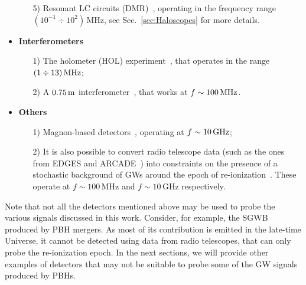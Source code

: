 \documentclass[11pt,a4paper]{article}
\begin{document}
\begin{itemize}[leftmargin=*]
\begin{itemize}[leftmargin=*]
\item[5)] Resonant LC circuits (DMR)~\cite{Domcke:2022rgu}, operating in the frequency range $(10^{-1} \div 10^2) \, \text{MHz}$, see Sec.~\ref{sec:Haloscopes} for more details.
\end{itemize}
%
\item {\bf Interferometers}
%
\begin{itemize}[leftmargin=*]
\item[1)] The holometer (HOL) experiment~\cite{Holometer:2016qoh}, that operates in the range $(1 \div 13) \, {\rm MHz}$;
\item[2)] A $0.75 \, \rm m$ interferometer~\cite{Akutsu:2008qv}, that works at $f \sim 100 \, {\rm MHz}$.
\end{itemize}
%
\item {\bf Others}
%
\begin{itemize}[leftmargin=*]
\item[1)] Magnon-based detectors~\cite{Ito:2019wcb}, operating at $f \sim 10 \, {\rm GHz}$;
\item[2)] It is also possible to convert radio telescope data (such as the ones from EDGES and ARCADE~\cite{Fixsen:2009xn, Bowman:2018yin}) into constraints on the presence of a stochastic background of GWs around the epoch of re-ionization~\cite{Domcke:2020yzq}. These operate at $f \sim 100 \, \text{MHz}$ and $f \sim 10 \, \text{GHz}$ respectively.
\end{itemize}
%	
\end{itemize}
%
Note that not all the detectors mentioned above may be used to probe the various signals discussed in this work. 
Consider, for example, the SGWB produced by PBH mergers. 
As most of its contribution is emitted in the late-time Universe, it cannot be detected using data from radio telescopes, that can only probe the re-ionization epoch. 
In the next sections, we will provide other examples of detectors that may not be suitable to probe some of the GW signals produced by PBHs.
\end{document}
